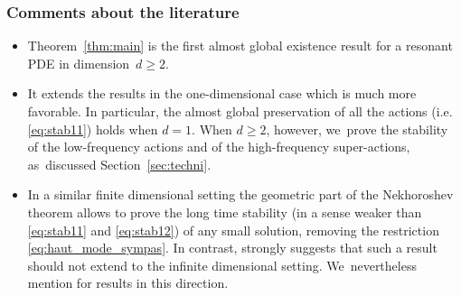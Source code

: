 \documentclass[10pt,a4paper]{amsart}
\providecommand{\ie}{i.e.}
\theoremstyle{plain}
\theoremstyle{definition}
\newcommand{\1}{\mathbf{1}}
\providecommand{\Subsubsection}{\subsubsection}
\providecommand{\Subsubsection}{\subsubsection}
\begin{document}
\Subsubsection{Comments about the literature}
\begin{itemize}
\item Theorem~\ref{thm:main} is the first almost global existence result for a resonant PDE in dimension~$d\geq2$.
\item It extends the results \cite{Bou00,KillBill} in the one-dimensional case which is much more favorable. In particular, the almost global preservation of all the actions (\ie \eqref{eq:stab11}) holds when $d=1$. When $d\geq2$, however, we~prove the stability of the low-frequency actions and of the high-frequency super-actions, as~discussed Section~\ref{sec:techni}.
\item In a similar finite dimensional setting the geometric part of the Nekhoroshev theorem allows to prove the long time stability (in a sense weaker than \eqref{eq:stab11} and \eqref{eq:stab12}) of any small solution, removing the restriction \eqref{eq:haut_mode_sympas}. In contrast, \cite{BouKal} strongly suggests that such a result should not extend to the infinite dimensional setting. We~nevertheless mention \cite{Bam99,BaG23} for results in this direction.
\end{itemize}
\end{document}
